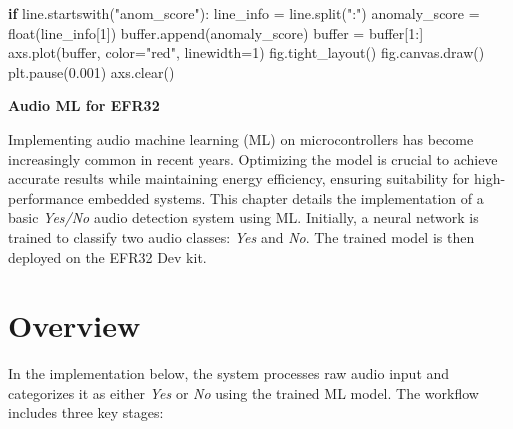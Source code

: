 \documentclass[
  9pt,
  letterpaper,
  abstract,
  titlepage]{scrbook}
\makeatletter
\newenvironment{Shaded}{\begin{snugshade}}{\end{snugshade}}
\newcommand{\ControlFlowTok}[1]{\textcolor[rgb]{0.00,0.23,0.31}{\textbf{#1}}}
\newcommand{\DataTypeTok}[1]{\textcolor[rgb]{0.68,0.00,0.00}{#1}}
\newcommand{\DecValTok}[1]{\textcolor[rgb]{0.68,0.00,0.00}{#1}}
\newcommand{\FloatTok}[1]{\textcolor[rgb]{0.68,0.00,0.00}{#1}}
\newcommand{\NormalTok}[1]{\textcolor[rgb]{0.00,0.23,0.31}{#1}}
\newcommand{\OperatorTok}[1]{\textcolor[rgb]{0.37,0.37,0.37}{#1}}
\newcommand{\StringTok}[1]{\textcolor[rgb]{0.13,0.47,0.30}{#1}}
\renewcommand\chapter{\clearpage\global\@topnum\z@
\@afterindentfalse \secdef\@chapter\@schapter}
\newif\if@firstnumbered%
\newif\if@firstunnumbered%
\newcounter{lastRomanPage}
\let\old@chapter\chapter%
\renewcommand{\chapter}{%
  \@ifstar{\unnumbered@chapter}{\numbered@chapter}%
}
\newcommand{\numbered@chapter}[1]{%
  \if@firstnumbered%
    \cleardoublepage%
    \setcounter{lastRomanPage}{\value{page}}%
    \pagenumbering{arabic}%
    \@firstnumberedfalse%
  \else
    \setcounter{page}{\value{page}}%
  \fi
  \old@chapter{#1}%
}
\newcommand{\unnumbered@chapter}[1]{%
  \if@firstunnumbered%
    \clearpage
    \setcounter{lastRomanPage}{\value{page}}%
    \pagenumbering{roman}%
    \@firstunnumberedfalse%
  \fi
  \old@chapter*{#1}%
}
\makeatother
\begin{document}
\begin{Shaded}
\begin{Highlighting}[]
\ControlFlowTok{if}\NormalTok{ line}\OperatorTok{.}\NormalTok{startswith}\OperatorTok{(}\StringTok{"anom\_score"}\OperatorTok{):}
\NormalTok{    line\_info }\OperatorTok{=}\NormalTok{ line}\OperatorTok{.}\NormalTok{split}\OperatorTok{(}\StringTok{":"}\OperatorTok{)}
\NormalTok{    anomaly\_score }\OperatorTok{=} \DataTypeTok{float}\OperatorTok{(}\NormalTok{line\_info}\OperatorTok{[}\DecValTok{1}\OperatorTok{])}
\NormalTok{    buffer}\OperatorTok{.}\NormalTok{append}\OperatorTok{(}\NormalTok{anomaly\_score}\OperatorTok{)}
\NormalTok{    buffer }\OperatorTok{=}\NormalTok{ buffer}\OperatorTok{[}\DecValTok{1}\OperatorTok{:]}
\NormalTok{    axs}\OperatorTok{.}\NormalTok{plot}\OperatorTok{(}\NormalTok{buffer}\OperatorTok{,}\NormalTok{ color}\OperatorTok{=}\StringTok{"red"}\OperatorTok{,}\NormalTok{ linewidth}\OperatorTok{=}\DecValTok{1}\OperatorTok{)}
\NormalTok{    fig}\OperatorTok{.}\NormalTok{tight\_layout}\OperatorTok{()}
\NormalTok{    fig}\OperatorTok{.}\NormalTok{canvas}\OperatorTok{.}\NormalTok{draw}\OperatorTok{()}
\NormalTok{    plt}\OperatorTok{.}\NormalTok{pause}\OperatorTok{(}\FloatTok{0.001}\OperatorTok{)}
\NormalTok{    axs}\OperatorTok{.}\NormalTok{clear}\OperatorTok{()}
\end{Highlighting}
\end{Shaded}

\chapter{\texorpdfstring{\textbf{Audio ML for
EFR32}}{Audio ML for EFR32}}\label{audio-ml-for-efr32}

Implementing audio machine learning (ML) on microcontrollers has become
increasingly common in recent years. Optimizing the model is crucial to
achieve accurate results while maintaining energy efficiency, ensuring
suitability for high-performance embedded systems. This chapter details
the implementation of a basic \emph{Yes/No} audio detection system using
ML. Initially, a neural network is trained to classify two audio
classes: \emph{Yes} and \emph{No}. The trained model is then deployed on
the EFR32 Dev kit.

\section{Overview}\label{overview-1}

In the implementation below, the system processes raw audio input and
categorizes it as either \emph{Yes} or \emph{No} using the trained ML
model. The workflow includes three key stages:
\end{document}
